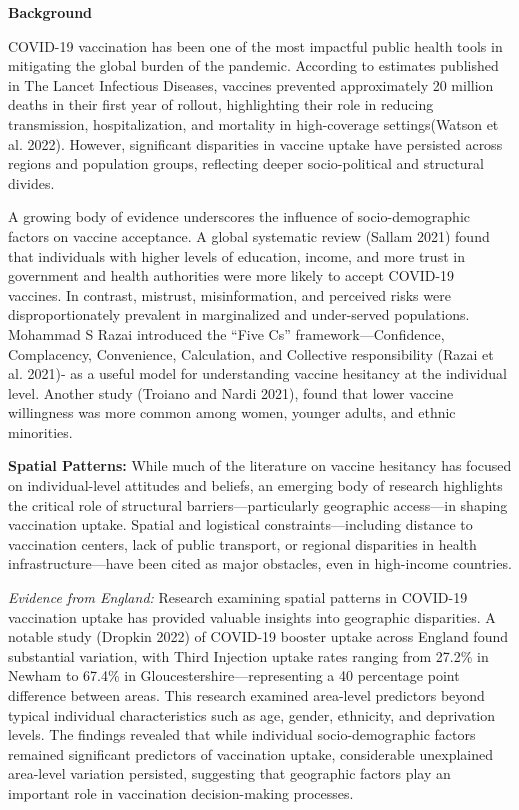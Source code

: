\documentclass{article}
\begin{document}
\textbf{Background}

COVID-19 vaccination has been one of the most impactful public health
tools in mitigating the global burden of the pandemic. According to
estimates published in The Lancet Infectious Diseases, vaccines
prevented approximately 20 million deaths in their first year of
rollout, highlighting their role in reducing transmission,
hospitalization, and mortality in high-coverage settings(Watson et al.
2022). However, significant disparities in vaccine uptake have persisted
across regions and population groups, reflecting deeper socio-political
and structural divides.

A growing body of evidence underscores the influence of
socio-demographic factors on vaccine acceptance. A global systematic
review (Sallam 2021) found that individuals with higher levels of
education, income, and more trust in government and health authorities
were more likely to accept COVID-19 vaccines. In contrast, mistrust,
misinformation, and perceived risks were disproportionately prevalent in
marginalized and under-served populations. Mohammad S Razai introduced
the ``Five Cs'' framework---Confidence, Complacency, Convenience,
Calculation, and Collective responsibility (Razai et al. 2021)- as a
useful model for understanding vaccine hesitancy at the individual
level. Another study (Troiano and Nardi 2021), found that lower vaccine
willingness was more common among women, younger adults, and ethnic
minorities.

\textbf{Spatial Patterns:} While much of the literature on vaccine
hesitancy has focused on individual-level attitudes and beliefs, an
emerging body of research highlights the critical role of structural
barriers---particularly geographic access---in shaping vaccination
uptake. Spatial and logistical constraints---including distance to
vaccination centers, lack of public transport, or regional disparities
in health infrastructure---have been cited as major obstacles, even in
high-income countries.

\emph{Evidence from England:} Research examining spatial patterns in
COVID-19 vaccination uptake has provided valuable insights into
geographic disparities. A notable study (Dropkin 2022) of COVID-19
booster uptake across England found substantial variation, with Third
Injection uptake rates ranging from 27.2\% in Newham to 67.4\% in
Gloucestershire---representing a 40 percentage point difference between
areas. This research examined area-level predictors beyond typical
individual characteristics such as age, gender, ethnicity, and
deprivation levels. The findings revealed that while individual
socio-demographic factors remained significant predictors of vaccination
uptake, considerable unexplained area-level variation persisted,
suggesting that geographic factors play an important role in vaccination
decision-making processes.
\end{document}
